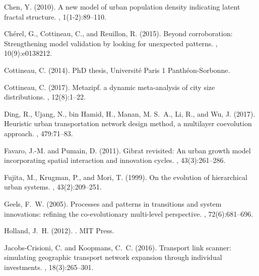 \documentclass[11pt]{article}
\begin{document}
\begin{thebibliography}{}
Chen, Y. (2010).
\newblock A new model of urban population density indicating latent fractal
  structure.
,
  1(1-2):89--110.

Ch{\'e}rel, G., Cottineau, C., and Reuillon, R. (2015).
\newblock Beyond corroboration: Strengthening model validation by looking for
  unexpected patterns.
, 10(9):e0138212.

Cottineau, C. (2014).
\newblock PhD thesis, Universit{\'e} Paris 1 Panth{\'e}on-Sorbonne.

Cottineau, C. (2017).
\newblock Metazipf. a dynamic meta-analysis of city size distributions.
, 12(8):1--22.

Ding, R., Ujang, N., bin Hamid, H., Manan, M. S.~A., Li, R., and Wu, J. (2017).
\newblock Heuristic urban transportation network design method, a multilayer
  coevolution approach.
,
  479:71--83.

Favaro, J.-M. and Pumain, D. (2011).
\newblock Gibrat revisited: An urban growth model incorporating spatial
  interaction and innovation cycles.
, 43(3):261--286.

Fujita, M., Krugman, P., and Mori, T. (1999).
\newblock On the evolution of hierarchical urban systems.
, 43(2):209--251.

Geels, F.~W. (2005).
\newblock Processes and patterns in transitions and system innovations:
  refining the co-evolutionary multi-level perspective.
, 72(6):681--696.

Holland, J.~H. (2012).
.
\newblock MIT Press.

Jacobs-Crisioni, C. and Koopmans, C.~C. (2016).
\newblock Transport link scanner: simulating geographic transport network
  expansion through individual investments.
, 18(3):265--301.


\end{thebibliography}
\end{document}
